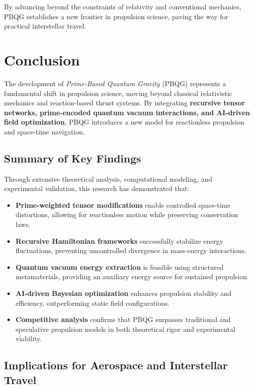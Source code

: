 \documentclass{article}
\theoremstyle{plain}
\begin{document}
By advancing beyond the constraints of relativity and conventional mechanics, PBQG establishes a new frontier in propulsion science, paving the way for practical interstellar travel.
\section{Conclusion}
\label{sec:conclusion}

The development of \textit{Prime-Based Quantum Gravity} (PBQG) represents a fundamental shift in propulsion science, moving beyond classical relativistic mechanics and reaction-based thrust systems. By integrating \textbf{recursive tensor networks, prime-encoded quantum vacuum interactions, and AI-driven field optimization}, PBQG introduces a new model for reactionless propulsion and space-time navigation.

\subsection{Summary of Key Findings}
\label{subsec:key_findings}

Through extensive theoretical analysis, computational modeling, and experimental validation, this research has demonstrated that:
\begin{itemize}
    \item \textbf{Prime-weighted tensor modifications} enable controlled space-time distortions, allowing for reactionless motion while preserving conservation laws.
    \item \textbf{Recursive Hamiltonian frameworks} successfully stabilize energy fluctuations, preventing uncontrolled divergence in mass-energy interactions.
    \item \textbf{Quantum vacuum energy extraction} is feasible using structured metamaterials, providing an auxiliary energy source for sustained propulsion.
    \item \textbf{AI-driven Bayesian optimization} enhances propulsion stability and efficiency, outperforming static field configurations.
    \item \textbf{Competitive analysis} confirms that PBQG surpasses traditional and speculative propulsion models in both theoretical rigor and experimental viability.
\end{itemize}

\subsection{Implications for Aerospace and Interstellar Travel}
\label{subsec:implications}
\end{document}

